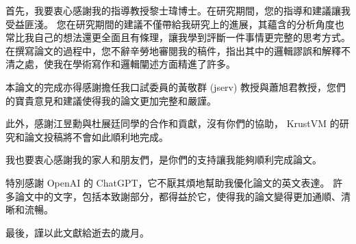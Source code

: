 
\begin{acknowledgement}

%
%
%
%
%

首先，我要衷心感謝我的指導教授黎士瑋博士。在研究期間，您的指導和建議讓我受益匪淺。
您在研究期間的建議不僅帶給我研究上的進展，其蘊含的分析角度也常比我自己的想法還更全面且有條理，讓我學到評斷一件事情更完整的思考方式。
在撰寫論文的過程中，您不辭辛勞地審閱我的稿件，指出其中的邏輯謬誤和解釋不清之處，使我在學術寫作和邏輯闡述方面精進了許多。

本論文的完成亦得感謝擔任我口試委員的黃敬群 (jserv) 教授與蕭旭君教授，您們的寶貴意見和建議使得我的論文更加完整和嚴謹。

此外，感謝江昱勳與杜展廷同學的合作和貢獻，沒有你們的協助， KrustVM 的研究和論文投稿將不會如此順利地完成。

我也要衷心感謝我的家人和朋友們，是你們的支持讓我能夠順利完成論文。

特別感謝 OpenAI 的 ChatGPT，它不厭其煩地幫助我優化論文的英文表達。
許多論文中的文字，包括本致謝部分，都得益於它，使得我的論文變得更加通順、清晰和流暢。

最後，謹以此文獻給逝去的歲月。

\end{acknowledgement}
